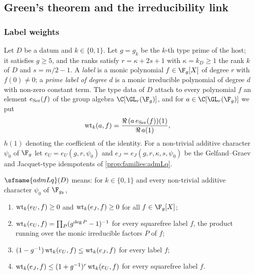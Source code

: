 \subsection{Green's theorem and the irreducibility link}\label{sec:pf:top-shape:irr}

\subsubsection*{Label weights}

Let $D$ be a datum and $k\in\{0,1\}$. Let $g=g_k$ be the $k$-th type prime of the host; it satisfies
$g\ge5$, and the ranks satisfy $r=\kappa+2s+1$ with $\kappa=k_D\ge1$ the rank $k$ of $D$ and $s=m/2-1$. A
\emph{label} is a monic polynomial $f\in\F_g[X]$ of degree $r$ with $f(0)\ne0$; a \emph{prime label of degree
$d$} is a monic irreducible polynomial of degree $d$ with non-zero constant term. The type data of $D$ attach to
every polynomial $f$ an element $e_{\rm Ser}(f)$ of the group algebra $\C[\GL_r(\F_g)]$, and for
$a\in\C[\GL_r(\F_g)]$ we put
\[
\mathrm{wt}_k(a,f)=\frac{\Re\,(a\,e_{\rm Ser}(f))(1)}{\Re\,a(1)},
\]
$h(1)$ denoting the coefficient of the identity. For a non-trivial additive character $\psi_0$ of $\F_g$ let
$e_U=e_U(g,r,\psi_0)$ and $e_J=e_J(g,r,\kappa,s,\psi_0)$ be the Gelfand--Graev and Jacquet-type idempotents of
\cref{prop:families:admLq}.

\begin{definition}\label{pf:top-shape:admLq}
$\sfname{admLq}(D)$ means: for $k\in\{0,1\}$ and every non-trivial additive character $\psi_0$ of $\F_{g_k}$,
\begin{enumerate}[label=(\arabic*)]
\item $\mathrm{wt}_k(e_U,f)\ge0$ and $\mathrm{wt}_k(e_J,f)\ge0$ for all $f\in\F_g[X]$;
\item $\mathrm{wt}_k(e_U,f)=\prod_{P}(g^{\deg P}-1)^{-1}$ for every squarefree label $f$, the product running
over the monic irreducible factors $P$ of $f$;
\item $(1-g^{-1})\,\mathrm{wt}_k(e_U,f)\le\mathrm{wt}_k(e_J,f)$ for every label $f$;
\item $\mathrm{wt}_k(e_J,f)\le(1+g^{-1})^r\,\mathrm{wt}_k(e_U,f)$ for every squarefree label $f$.
\end{enumerate}
\end{definition}

